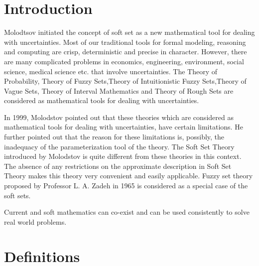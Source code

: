 \documentclass[12pt]{article} %
\begin{document}
\begin{titlepage}
\begin{center}
\begin{minipage}{0.8\textwidth}
\begin{flushleft}
\end{flushleft}
\end{minipage}
\vfill

{\large}

\end{center}

\end{titlepage}



\maketitle
\setcounter{secnumdepth}{1}

\section{Introduction}
Molodtsov initiated the concept of soft set as a new mathematical tool for dealing with uncertainties. Most of our traditional tools for formal modeling, reasoning and computing are crisp, deterministic and precise in character. However, there are many complicated problems in economics,
engineering, environment, social science, medical science etc.
that involve uncertainties. The Theory of Probability, Theory of
Fuzzy Sets,Theory of Intuitionistic Fuzzy Sets,Theory of Vague
Sets, Theory of Interval Mathematics and Theory of Rough Sets
are considered as mathematical tools for dealing with
uncertainties.

In 1999, Molodstov pointed out that these
theories which are considered as mathematical tools for dealing
with uncertainties, have certain limitations. He further pointed
out that the reason for these limitations is, possibly, the
inadequacy of the parameterization tool of the theory. The Soft
Set Theory introduced by Molodstov is quite different from
these theories in this context. The absence of any restrictions on
the approximate description in Soft Set Theory makes this
theory very convenient and easily applicable. Fuzzy set theory
proposed by Professor L. A. Zadeh in 1965 is considered as a
special case of the soft sets.

Current and soft mathematics can
co-exist and can be used consistently to solve real
world problems.




\section{Definitions}
\end{document}
